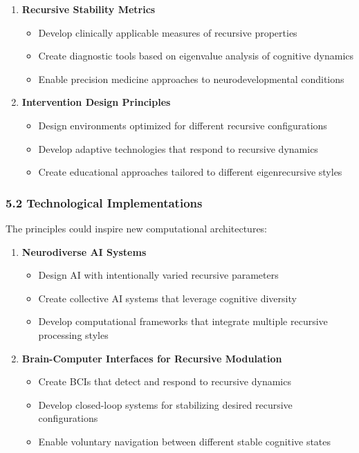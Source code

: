 \documentclass[
]{article}
\providecommand{\tightlist}{%
  \setlength{\itemsep}{0pt}\setlength{\parskip}{0pt}}
\begin{document}
\begin{enumerate}
\def\labelenumi{\arabic{enumi}.}
\tightlist
\item
  \textbf{Recursive Stability Metrics}

  \begin{itemize}
  \tightlist
  \item
    Develop clinically applicable measures of recursive properties
  \item
    Create diagnostic tools based on eigenvalue analysis of cognitive
    dynamics
  \item
    Enable precision medicine approaches to neurodevelopmental
    conditions
  \end{itemize}
\item
  \textbf{Intervention Design Principles}

  \begin{itemize}
  \tightlist
  \item
    Design environments optimized for different recursive configurations
  \item
    Develop adaptive technologies that respond to recursive dynamics
  \item
    Create educational approaches tailored to different eigenrecursive
    styles
  \end{itemize}
\end{enumerate}

\subsubsection{5.2 Technological
Implementations}\label{technological-implementations}

The principles could inspire new computational architectures:

\begin{enumerate}
\def\labelenumi{\arabic{enumi}.}
\tightlist
\item
  \textbf{Neurodiverse AI Systems}

  \begin{itemize}
  \tightlist
  \item
    Design AI with intentionally varied recursive parameters
  \item
    Create collective AI systems that leverage cognitive diversity
  \item
    Develop computational frameworks that integrate multiple recursive
    processing styles
  \end{itemize}
\item
  \textbf{Brain-Computer Interfaces for Recursive Modulation}

  \begin{itemize}
  \tightlist
  \item
    Create BCIs that detect and respond to recursive dynamics
  \item
    Develop closed-loop systems for stabilizing desired recursive
    configurations
  \item
    Enable voluntary navigation between different stable cognitive
    states
  \end{itemize}
\end{enumerate}
\end{document}
